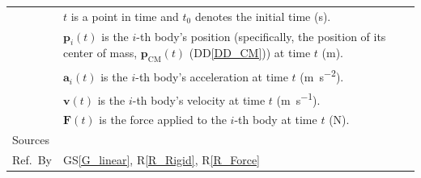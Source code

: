 \documentclass[12pt]{article}
\newcommand{\colAwidth}{0.13\textwidth}
\newcommand{\colBwidth}{0.82\textwidth}
\begin{document}
\begin{minipage}{\textwidth}
\begin{tabular}{| p{\colAwidth} | p{\colBwidth}|}
 & $t$ is a point in time and $t_0$ denotes the initial time (\si{\second}). \\
 & $\mathbf{p}_i(t)$ is the $i$-th body's position (specifically, the position of its center of mass, $\mathbf{p}_\mathrm{CM}(t)$
 (DD\ref{DD_CM})) at time $t$ (\si{\metre}). \\
 & $\mathbf{a}_i(t)$ is the $i$-th body's acceleration at time $t$ (\si{\metre\per\second\tothe{2}}). \\
 & $\mathbf{v}(t)$ is the $i$-th body's velocity at time $t$ (\si{\metre\per\second}). \\
 & $\mathbf{F}(t)$ is the force applied to the $i$-th body at time $t$ (\si{\newton}). \\
  \hline
  Sources & \\
  \hline
Ref.\ By & GS\ref{G_linear}, R\ref{R_Rigid}, R\ref{R_Force} \\
  \hline
\end{tabular}
\end{minipage}

~\newline

 
\end{document}
